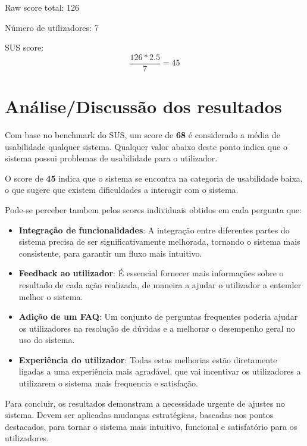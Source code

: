 \documentclass[a4paper,12pt]{article}
\begin{document}
Raw score total: 126
\vspace{0.2cm}

Número de utilizadores: 7
\vspace{0.4cm}

SUS score: \[\frac{126 * 2.5}{7} = 45\]

\newpage
\section{Análise/Discussão dos resultados}

Com base no benchmark do SUS, um score de \textbf{68} é considerado a média de usabilidade qualquer sistema. Qualquer valor abaixo deste ponto indica que o sistema possui problemas de usabilidade para o utilizador.

O score de \textbf{45} indica que o sistema se encontra na categoria de usabilidade baixa, o que sugere que existem dificuldades a interagir com o sistema.
\vspace{0.2cm}

Pode-se perceber tambem pelos scores individuais obtidos em cada pergunta que:
\begin{itemize}
    \item \textbf{Integração de funcionalidades}: A integração entre diferentes partes do sistema precisa de ser significativamente melhorada, tornando o sistema mais consistente, para garantir um fluxo mais intuitivo.
    \item \textbf{Feedback ao utilizador}: É essencial fornecer mais informações sobre o resultado de cada ação realizada, de maneira a ajudar o utilizador a entender melhor o sistema.
    \item \textbf{Adição de um FAQ}: Um conjunto de perguntas frequentes poderia ajudar os utilizadores na resolução de dúvidas e a melhorar o desempenho geral no uso do sistema.
    \item \textbf{Experiência do utilizador}: Todas estas melhorias estão diretamente ligadas a uma experiência mais agradável, que vai incentivar os utilizadores a utilizarem o sistema mais frequencia e satisfação.
\end{itemize}

Para concluir, os resultados demonstram a necessidade urgente de ajustes no sistema. Devem ser aplicadas mudanças estratégicas, baseadas nos pontos destacados, para tornar o sistema mais intuitivo, funcional e satisfatório para os utilizadores.
\end{document}
